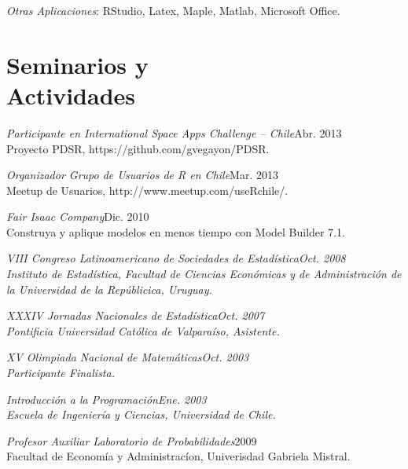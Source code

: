 \documentclass[margin]{res}
\begin{document}
\begin{resume}
    {\sl Otras Aplicaciones}: RStudio, Latex, Maple, Matlab, Microsoft Office.

\vspace{1cm}

\newpage

\section{Seminarios y\\Actividades}
    
    {\sl Participante en International Space Apps Challenge – Chile}\hfill Abr. 2013\\
    Proyecto PDSR, https://github.com/gvegayon/PDSR.
    
    {\sl Organizador Grupo de Usuarios de R en Chile}\hfill Mar. 2013\\
    Meetup de Usuarios, http://www.meetup.com/useRchile/.
    

    {\sl Fair Isaac Company}\hfill Dic. 2010\\
    Construya y aplique modelos en menos tiempo con Model Builder 7.1.

    {\sl VIII Congreso Latinoamericano de Sociedades de Estadística\hfill Oct. 2008\\
    Instituto de Estadística, Facultad de Ciencias Económicas y de Administración de la Universidad de la Repúblicica, Uruguay.

    {\sl XXXIV Jornadas Nacionales de Estadística\hfill Oct. 2007\\
    Pontificia  Universidad Católica de Valparaíso, Asistente.


    {\sl XV Olimpiada Nacional de Matemáticas\hfill Oct. 2003\\
    Participante Finalista.

    {\sl Introducción a la Programación\hfill Ene. 2003\\
    Escuela de Ingeniería y Ciencias, Universidad de Chile.

    {\sl Profesor Auxiliar Laboratorio de Probabilidades}\hfill 2009\\
    Facultad de Economía y Administracíon, Univerisdad Gabriela Mistral.


}}}}
\end{resume}
\end{document}
